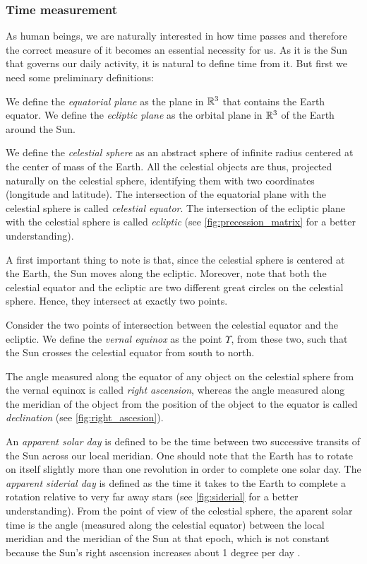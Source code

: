 \documentclass[../main.tex]{subfiles}
\begin{document}
\subsubsection{Time measurement}\label{sec:time_measurement}
As human beings, we are naturally interested in how time passes and therefore the correct measure of it becomes an essential necessity for us. As it is the Sun that governs our daily activity, it is natural to define time from it.
But first we need some preliminary definitions:
\begin{definition}
  We define the \emph{equatorial plane} as the plane in $\mathbb{R}^3$ that contains the Earth equator. We define the \emph{ecliptic plane} as the orbital plane in $\mathbb{R}^3$ of the Earth around the Sun.
\end{definition}
\begin{definition}
  We define the \emph{celestial sphere} as an abstract sphere of infinite radius centered at the center of mass of the Earth. All the celestial objects are thus, projected naturally on the celestial sphere, identifying them with two coordinates (longitude and latitude). The intersection of the equatorial plane with the celestial sphere is called \emph{celestial equator}. The intersection of the ecliptic plane with the celestial sphere is called \emph{ecliptic} (see \cref{fig:precession_matrix} for a better understanding).
\end{definition}
A first important thing to note is that, since the celestial sphere is centered at the Earth, the Sun moves along the ecliptic. Moreover, note that both the celestial equator and the ecliptic are two different great circles on the celestial sphere. Hence, they intersect at exactly two points.

\begin{definition}
  Consider the two points of intersection between the celestial equator and the ecliptic. We define the \emph{vernal equinox} as the point $\Upsilon$, from these two, such that the Sun crosses the celestial equator from south to north.
\end{definition}
The angle measured along the equator of any object on the celestial sphere from the vernal equinox is called \emph{right ascension}, whereas the angle measured along the meridian of the object from the position of the object to the equator is called \emph{declination} (see \cref{fig:right_ascesion}).

An \emph{apparent solar day} is defined to be the time between two successive transits of the Sun across our local meridian. One should note that the Earth has to rotate on itself slightly more than one revolution in order to complete one solar day. The \emph{apparent siderial day} is defined as the time it takes to the Earth to complete a rotation relative to very far away stars (see \cref{fig:siderial} for a better understanding). From the point of view of the celestial sphere, the aparent solar time is the angle (measured along the celestial equator) between the local meridian and the meridian of the Sun at that epoch, which is not constant because the Sun's right ascension increases about 1 degree per day \cite{montenbruck}.
\end{document}
